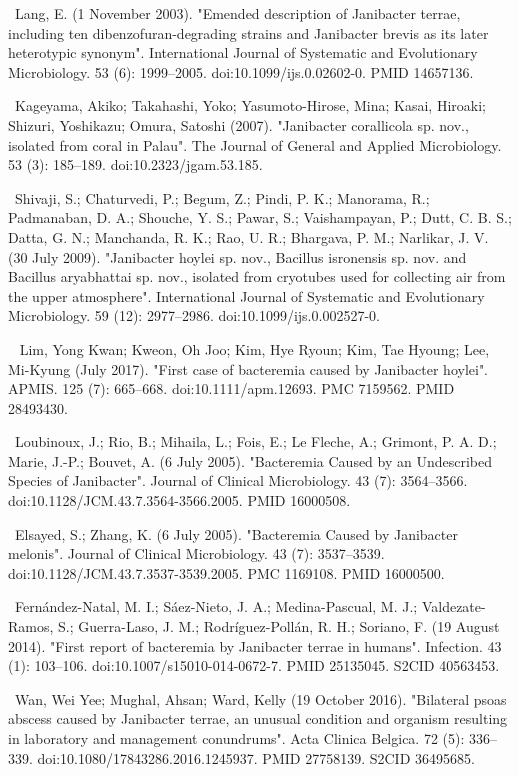 \documentclass[11pt]{article}
\begin{document}
\begin{thebibliography}{3}
	~Lang, E. (1 November 2003). "Emended description of Janibacter terrae, including ten dibenzofuran-degrading strains and Janibacter brevis as its later heterotypic synonym". International Journal of Systematic and Evolutionary Microbiology. 53 (6): 1999–2005. doi:10.1099/ijs.0.02602-0. PMID 14657136.
	
	~Kageyama, Akiko; Takahashi, Yoko; Yasumoto-Hirose, Mina; Kasai, Hiroaki; Shizuri, Yoshikazu; Omura, Satoshi (2007). "Janibacter corallicola sp. nov., isolated from coral in Palau". The Journal of General and Applied Microbiology. 53 (3): 185–189. doi:10.2323/jgam.53.185.
	
	~Shivaji, S.; Chaturvedi, P.; Begum, Z.; Pindi, P. K.; Manorama, R.; Padmanaban, D. A.; Shouche, Y. S.; Pawar, S.; Vaishampayan, P.; Dutt, C. B. S.; Datta, G. N.; Manchanda, R. K.; Rao, U. R.; Bhargava, P. M.; Narlikar, J. V. (30 July 2009). "Janibacter hoylei sp. nov., Bacillus isronensis sp. nov. and Bacillus aryabhattai sp. nov., isolated from cryotubes used for collecting air from the upper atmosphere". International Journal of Systematic and Evolutionary Microbiology. 59 (12): 2977–2986. doi:10.1099/ijs.0.002527-0.
	
	~ Lim, Yong Kwan; Kweon, Oh Joo; Kim, Hye Ryoun; Kim, Tae Hyoung; Lee, Mi-Kyung (July 2017). "First case of bacteremia caused by Janibacter hoylei". APMIS. 125 (7): 665–668. doi:10.1111/apm.12693. PMC 7159562. PMID 28493430.
	
	~Loubinoux, J.; Rio, B.; Mihaila, L.; Fois, E.; Le Fleche, A.; Grimont, P. A. D.; Marie, J.-P.; Bouvet, A. (6 July 2005). "Bacteremia Caused by an Undescribed Species of Janibacter". Journal of Clinical Microbiology. 43 (7): 3564–3566. doi:10.1128/JCM.43.7.3564-3566.2005. PMID 16000508.
	
	~Elsayed, S.; Zhang, K. (6 July 2005). "Bacteremia Caused by Janibacter melonis". Journal of Clinical Microbiology. 43 (7): 3537–3539. doi:10.1128/JCM.43.7.3537-3539.2005. PMC 1169108. PMID 16000500.
	
	~Fernández-Natal, M. I.; Sáez-Nieto, J. A.; Medina-Pascual, M. J.; Valdezate-Ramos, S.; Guerra-Laso, J. M.; Rodríguez-Pollán, R. H.; Soriano, F. (19 August 2014). "First report of bacteremia by Janibacter terrae in humans". Infection. 43 (1): 103–106. doi:10.1007/s15010-014-0672-7. PMID 25135045. S2CID 40563453.

	~Wan, Wei Yee; Mughal, Ahsan; Ward, Kelly (19 October 2016). "Bilateral psoas abscess caused by Janibacter terrae, an unusual condition and organism resulting in laboratory and management conundrums". Acta Clinica Belgica. 72 (5): 336–339. doi:10.1080/17843286.2016.1245937. PMID 27758139. S2CID 36495685.
	

\end{thebibliography}
\end{document}
